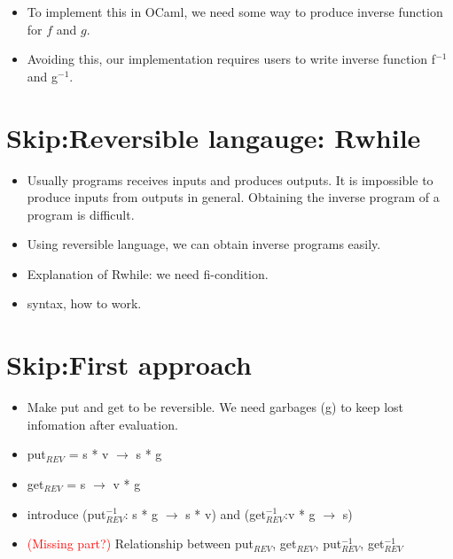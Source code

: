 \documentclass[runningheads]{llncs}
\newcommand{\sif}[3]{\text{if } #1 \text{ then } #2 \text{ else } #3}
\newcommand{\revput}[3]{put$_{REV}$ \ {#1} \ {#2} \ {#3}}
\begin{document}
\begin{itemize}
\item To implement this in OCaml, we need some way to produce inverse function for $f$ and $g$.
\item Avoiding this, our implementation requires users to write inverse function f$^{-1}$ and g$^{-1}$.
\end{itemize}

\section{Skip:Reversible langauge: Rwhile}


\begin{itemize}
\item Usually programs receives inputs and produces outputs. It is impossible to produce inputs from outputs in general. Obtaining the inverse program of a program is difficult.
\item Using reversible language, we can obtain inverse programs easily.
\item Explanation of Rwhile: we need fi-condition.
\item syntax, how to work.
\end{itemize}

\section{Skip:First approach}


\begin{itemize}
\item Make put and get to be reversible. We need garbages (g) to keep lost infomation after evaluation.
\item put$_{REV}$ = s * v $\to$ s * g
\item get$_{REV}$ = s $\to$ v * g
\item introduce (put$_{REV}^{-1}$: s * g $\to$ s * v) and (get$_{REV}^{-1}$:v * g $\to$ s)
\item \textcolor{red}{(Missing part?)} Relationship between put$_{REV}$, get$_{REV}$, put$_{REV}^{-1}$, get$_{REV}^{-1}$ 
\end{itemize}





\end{document}

